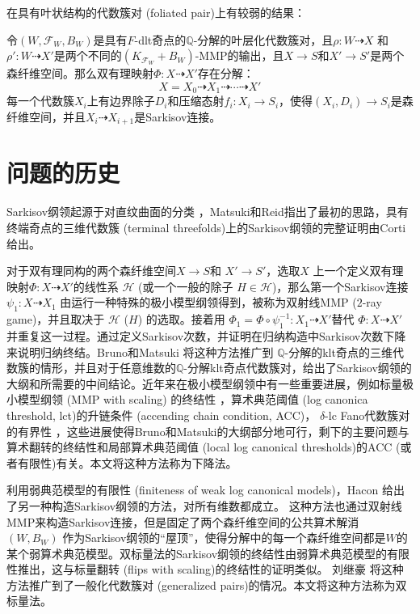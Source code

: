 在具有叶状结构的代数簇对 (foliated pair)上有较弱的结果：
\begin{theorem}[弱Sarkisov分解]\label{mainf}
  令$(W,\mathcal{F}_{W},B_{W})$是具有$F$-dlt奇点的$\mathbb{Q}$-分解的叶层化代数簇对，且$\rho:W\dashrightarrow X$ 和$\rho':W \dashrightarrow X'$是两个不同的$(K_{\mathcal{F}_{W}}+B_{W})$-MMP的输出，且$X \to S$和$X' \to S'$是两个森纤维空间。那么双有理映射$\Phi:X \dashrightarrow X'$存在分解：
  \[ X=X_{0}\dashrightarrow X_{1}\dashrightarrow \cdots \dashrightarrow X' \]
  每一个代数簇$X_{i}$上有边界除子$D_{i}$和压缩态射$f_{i}:X_{i}\to S_{i}$，使得$(X_{i},D_{i})\to S_{i}$是森纤维空间，并且$X_{i} \dashrightarrow X_{i+1}$是Sarkisov连接。
\end{theorem}

\section{问题的历史}
Sarkisov纲领起源于对直纹曲面的分类 \cite{sarkisovBIRATIONALAUTOMORPHISMSCONIC1981,sarkisovCONICBUNDLESTRUCTURES1983}，Matsuki和Reid指出了最初的思路，具有终端奇点的三维代数簇 (terminal threefolds)上的Sarkisov纲领的完整证明由Corti\cite{cortiFactoringBirationalMaps}给出。 

对于双有理同构的两个森纤维空间$X\to S$和 $X'\to S'$，选取$X$ 上一个定义双有理映射$\Phi:X \dashrightarrow X'$的线性系 $\mathcal{H}$ (或一个一般的除子 $H \in \mathcal{H}$)，那么第一个Sarkisov连接 $\psi_1:X\dashrightarrow X_1$ 由运行一种特殊的极小模型纲领得到，被称为双射线MMP ($2$-ray game)，并且取决于 $\mathcal{H}$ ($H$) 的选取。接着用 $\Phi_{1}=\Phi\circ \psi_1^{-1}: X_1 \dashrightarrow X'$替代 $\Phi:X\dashrightarrow X'$并重复这一过程。通过定义Sarkisov次数，并证明在归纳构造中Sarkisov次数下降来说明归纳终结。Bruno和Matsuki \cite{brunoLogSarkisovProgram1995} 将这种方法推广到 $\mathbb{Q}$-分解的klt奇点的三维代数簇的情形，并且对于任意维数的$\mathbb{Q}$-分解klt奇点代数簇对，给出了Sarkisov纲领的大纲和所需要的中间结论。近年来在极小模型纲领中有一些重要进展，例如标量极小模型纲领 (MMP with scaling) 的终结性 \cite{BCHM10}，算术典范阈值 (log canonica threshold, lct)的升链条件 (accending chain condition, ACC)\cite{HMX14}， $\delta$-lc Fano代数簇对的有界性 \cite{Bir19,birkarSingularitiesLinearSystems2020}，这些进展使得Bruno和Matsuki的大纲部分地可行，剩下的主要问题与算术翻转的终结性和局部算术典范阈值 (local log canonical thresholds)的ACC (或者有限性)有关。本文将这种方法称为下降法。


利用弱典范模型的有限性\cite{BCHM10} (finiteness of weak log canonical models)，Hacon \cite{haconMinimalModelProgram2012} 给出了另一种构造Sarkisov纲领的方法，对所有维数都成立。
这种方法也通过双射线MMP来构造Sarkisov连接，但是固定了两个森纤维空间的公共算术解消 $(W,B_W)$ 作为Sarkisov纲领的``屋顶''，使得分解中的每一个森纤维空间都是$W$的某个弱算术典范模型。双标量法的Sarkisov纲领的终结性由弱算术典范模型的有限性推出，这与标量翻转 (flips with scaling)的终结性的证明类似。
刘继豪 \cite{liuSarkisovProgramGeneralized2021} 将这种方法推广到了一般化代数簇对 (generalized pairs)的情况。本文将这种方法称为双标量法。


